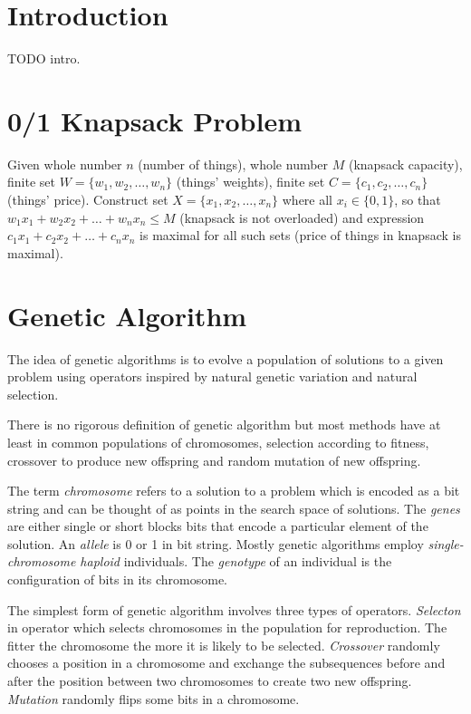 \documentclass{article}
\begin{document}
\section{Introduction}

TODO intro.

\section{0/1 Knapsack Problem}

Given whole number $n$ (number of things),
whole number $M$ (knapsack capacity),
finite set $W = \{w_1, w_2, \dots , w_n\}$ (things' weights),
finite set $C = \{c_1, c_2, \dots , c_n\}$ (things' price).
Construct set $X = \{x_1, x_2, \dots , x_n\}$ where all $x_i \in \{0, 1\}$,
so that $w_1 x_1 + w_2 x_2 + \dots + w_n x_n \leq M$
(knapsack is not overloaded)
and expression $c_1 x_1 + c_2 x_2 + \dots + c_n x_n$ is maximal for all such
sets (price of things in knapsack is maximal).

\section{Genetic Algorithm}

The idea of genetic algorithms is to evolve a population of solutions
to a given problem using operators inspired by natural genetic variation
and natural selection.
\cite{mitchell1996}

There is no rigorous definition of genetic algorithm but most methods
have at least in common populations of chromosomes,
selection according to fitness, crossover to produce new offspring
and random mutation of new offspring.
\cite{mitchell1996}

The term \textit{chromosome} refers to a solution to a problem
which is encoded as a bit string
and can be thought of as points in the search space of solutions.
The \textit{genes} are either single or short blocks bits
that encode a particular element of the solution.
An \textit{allele} is 0 or 1 in bit string.
Mostly genetic algorithms employ \textit{single-chromosome haploid} individuals.
The \textit{genotype} of an individual is the configuration of bits
in its chromosome.
\cite{mitchell1996}

The simplest form of genetic algorithm involves three types of operators.
\textit{Selecton} in operator which selects chromosomes in the population for
reproduction.
The fitter the chromosome the more it is likely to be selected.
\textit{Crossover} randomly chooses a position in a chromosome
and exchange the subsequences before and after the position between
two chromosomes to create two new offspring.
\textit{Mutation} randomly flips some bits in a chromosome.
\cite{mitchell1996}
\end{document}
